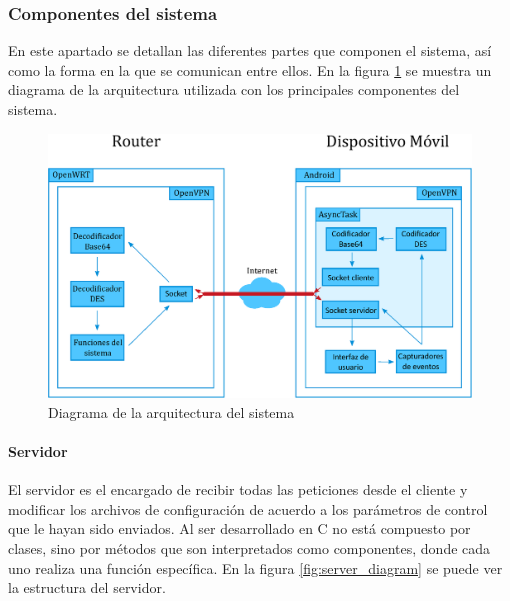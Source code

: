 \documentclass[12pt]{article}
\begin{document}
        \subsubsection{Componentes del sistema}
            En este apartado se detallan las diferentes partes que componen el sistema, así como la forma en la que se comunican entre ellos. En la figura \ref{fig:system_diagram} se muestra un diagrama de la arquitectura utilizada con los principales componentes del sistema.

            \begin{figure}[h!]
            \centering
                \includegraphics[scale=0.5]{system_diagram.eps}
                \caption{Diagrama de la arquitectura del sistema}
                \label{fig:system_diagram}
            \end{figure}

            \paragraph{ Servidor}
            El servidor es el encargado de recibir todas las peticiones desde el cliente y modificar los archivos de configuración de acuerdo a los parámetros de control que le hayan sido enviados. Al ser desarrollado en C no está compuesto por clases, sino por métodos que son interpretados como componentes, donde cada uno realiza una función específica. En la figura \ref{fig:server_diagram} se puede ver la estructura del servidor.
\end{document}
